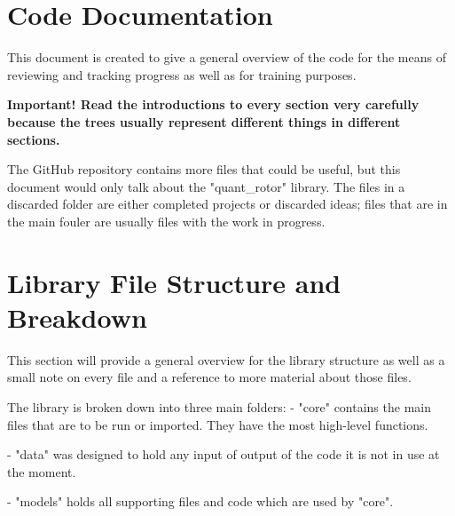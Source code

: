 \documentclass[a4paper,10pt]{article}
\begin{document}
\section*{Code Documentation}

This document is created to give a general overview of the code for the means of reviewing and tracking progress as well as for training purposes.

\textbf{Important! Read the introductions to every section very carefully because the trees usually represent different things in different sections.}

The GitHub repository contains more files that could be useful, but
this document would only talk about the "quant\_rotor" library. The files in a discarded folder are either completed projects or discarded ideas; files that are in the main fouler are usually files with the work in progress.






\section*{Library File Structure and Breakdown}

This section will provide a general overview for the library structure as well as a small note on every
file and a reference to more material about those files.\newline

The library is broken down into three main folders:
\newline \newline
- "core" contains the main files that are to be run or imported. They have the most high-level functions.

- "data" was designed to hold any input of output of the code it is not in use at the moment.

- "models" holds all supporting files and code which are used by "core".
\newline
\end{document}
